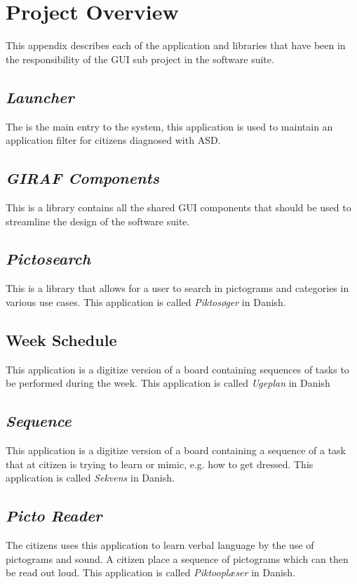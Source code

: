 \chapter{Project Overview} %
\label{cha:project_overview}

This appendix describes each of the application and libraries that have been in the responsibility of the GUI sub project in the \giraf software suite. 

\section{\emph{Launcher}}
\label{sec:app_launcher}
The \launcher is the main entry to the system, this application is used to maintain an application filter for citizens diagnosed with ASD.

\section{\emph{GIRAF Components}}
\label{sec:app_giraf_components}
This is a library contains all the shared GUI components that should be used to streamline the design of the \giraf software suite.

\section{\emph{Pictosearch}}
\label{sec:app_pictosearch}
This is a library that allows for a user to search in pictograms and categories in various use cases. This application is called \emph{Piktosøger} in Danish.

\section{Week Schedule}
\label{sec:app_week_schedule}
This application is a digitize version of a board containing sequences of tasks to be performed during the week. This application is called \emph{Ugeplan} in Danish 

\section{\emph{Sequence}}
\label{sec:app_sequence}
This application is a digitize version of a board containing a sequence of a task that at citizen is trying to learn or mimic, e.g. how to get dressed. This application is called \emph{Sekvens} in Danish.

\section{\emph{Picto Reader}}
\label{sec:app_picto_reader}
The citizens uses this application to learn verbal language by the use of pictograms and sound. A citizen place a sequence of pictograms which can then be read out loud. This application is called \emph{Piktooplæser} in Danish.

